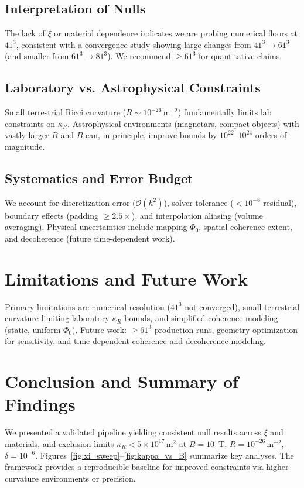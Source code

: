 \documentclass[10pt,twocolumn]{article}
\begin{document}
\subsection{Interpretation of Nulls}
The lack of $\xi$ or material dependence indicates we are probing numerical floors at $41^3$, consistent with a convergence study showing large changes from $41^3\to61^3$ (and smaller from $61^3\to81^3$). We recommend $\ge 61^3$ for quantitative claims.

\subsection{Laboratory vs. Astrophysical Constraints}
Small terrestrial Ricci curvature ($R\sim10^{-26}\,\mathrm{m^{-2}}$) fundamentally limits lab constraints on $\kappa_R$. Astrophysical environments (magnetars, compact objects) with vastly larger $R$ and $B$ can, in principle, improve bounds by $10^{22}$--$10^{24}$ orders of magnitude.

\subsection{Systematics and Error Budget}
We account for discretization error ($\mathcal{O}(h^2)$), solver tolerance ($<10^{-8}$ residual), boundary effects (padding $\ge 2.5\times$), and interpolation aliasing (volume averaging). Physical uncertainties include mapping $\Phi_0$, spatial coherence extent, and decoherence (future time-dependent work).

\section{Limitations and Future Work}
Primary limitations are numerical resolution ($41^3$ not converged), small terrestrial curvature limiting laboratory $\kappa_R$ bounds, and simplified coherence modeling (static, uniform $\Phi_0$). Future work: $\ge 61^3$ production runs, geometry optimization for sensitivity, and time-dependent coherence and decoherence modeling.

\section{Conclusion and Summary of Findings}
We presented a validated pipeline yielding consistent null results across $\xi$ and materials, and exclusion limits $\kappa_R < 5\times10^{17}\,\mathrm{m^2}$ at $B=10$~T, $R=10^{-26}\,\mathrm{m^{-2}}$, $\delta=10^{-6}$. Figures~\ref{fig:xi_sweep}--\ref{fig:kappa_vs_B} summarize key analyses. The framework provides a reproducible baseline for improved constraints via higher curvature environments or precision.
\end{document}
